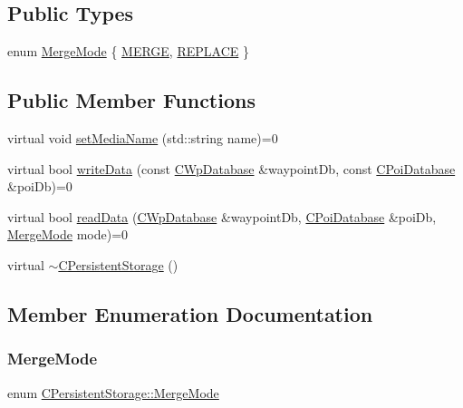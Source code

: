 \subsection*{Public Types}
\begin{DoxyCompactItemize}
\item 
enum \hyperlink{classCPersistentStorage_a9b9929a4afa6e21da10f4a2e926a4584}{Merge\+Mode} \{ \hyperlink{classCPersistentStorage_a9b9929a4afa6e21da10f4a2e926a4584a61eb51fcd97853482d0436ea6b5fec2f}{M\+E\+R\+GE}, 
\hyperlink{classCPersistentStorage_a9b9929a4afa6e21da10f4a2e926a4584a5eb3db7839315215409a77d1c58230ac}{R\+E\+P\+L\+A\+CE}
 \}
\end{DoxyCompactItemize}
\subsection*{Public Member Functions}
\begin{DoxyCompactItemize}
\item 
virtual void \hyperlink{classCPersistentStorage_af626d001915346c04c2008c9ea8bb8d8}{set\+Media\+Name} (std\+::string name)=0
\item 
virtual bool \hyperlink{classCPersistentStorage_ab0c03dbf674c6218d574289ec54a75ed}{write\+Data} (const \hyperlink{classCWpDatabase}{C\+Wp\+Database} \&waypoint\+Db, const \hyperlink{classCPoiDatabase}{C\+Poi\+Database} \&poi\+Db)=0
\item 
virtual bool \hyperlink{classCPersistentStorage_a28edf547e10449a7f45de9885b68890b}{read\+Data} (\hyperlink{classCWpDatabase}{C\+Wp\+Database} \&waypoint\+Db, \hyperlink{classCPoiDatabase}{C\+Poi\+Database} \&poi\+Db, \hyperlink{classCPersistentStorage_a9b9929a4afa6e21da10f4a2e926a4584}{Merge\+Mode} mode)=0
\item 
virtual \hyperlink{classCPersistentStorage_a040e22bf1000853fbcd2ff45239386d9}{$\sim$\+C\+Persistent\+Storage} ()
\end{DoxyCompactItemize}


\subsection{Member Enumeration Documentation}
\mbox{\label{classCPersistentStorage_a9b9929a4afa6e21da10f4a2e926a4584}} 
\subsubsection{\texorpdfstring{Merge\+Mode}{MergeMode}}
{\footnotesize\ttfamily enum \hyperlink{classCPersistentStorage_a9b9929a4afa6e21da10f4a2e926a4584}{C\+Persistent\+Storage\+::\+Merge\+Mode}}

